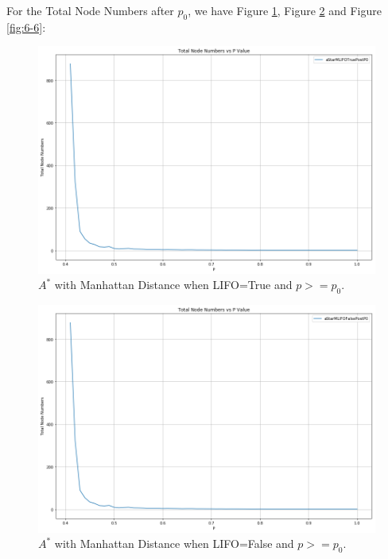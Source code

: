 \documentclass[letter]{article}
\begin{document}
\begin{questions}
	For the Total Node Numbers after $ p_0 $, we have Figure \ref{fig:6-4}, Figure \ref{fig:6-5} and Figure \ref{fig:6-6}: \\
	
	\begin{figure}
		\centering
		\includegraphics[width=\textwidth]{../pics/question6-4.png}
		\caption{\label{fig:6-4} $ A^* $ with Manhattan Distance when LIFO=True and $ p >= p_0 $.}
	\end{figure}
	
	\begin{figure}
		\centering
		\includegraphics[width=\textwidth]{../pics/question6-5.png}
		\caption{\label{fig:6-5}$ A^* $ with Manhattan Distance when LIFO=False and $ p >= p_0 $.}
	\end{figure}


\end{questions}
\end{document}
